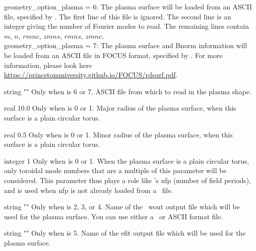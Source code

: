 {{\ttfamily geometry\_option\_plasma} = 6: The plasma surface will be loaded from an ASCII file, specified by . The first line of this file is ignored. The second line is an integer giving the number of Fourier modes
to read. The remaining lines contain $m$, $n$, $rmnc$, $zmns$, $rmns$, $zmnc$. \\

{\ttfamily geometry\_option\_plasma} = 7: The plasma surface and Bnorm information will be loaded from an ASCII file in FOCUS format, specified by . For more information, please look here \url{https://princetonuniversity.github.io/FOCUS/rdsurf.pdf}.

}

\myhrule

{string}
{{\ttfamily ""}}
{Only when  is 6 or 7.}
{ASCII file from which to read in the plasma shape.}

\myhrule

{real}
{10.0}
{Only when  is 0 or 1.}
{Major radius of the plasma surface, when this surface is a plain circular torus.}

\myhrule

{real}
{0.5}
{Only when  is 0 or 1.}
{Minor radius of the plasma surface, when this surface is a plain circular torus.}

\myhrule

{integer}
{1}
{Only when  is 0 or 1.}
{When the plasma surface is a plain circular torus, only toroidal mode numbers that are a multiple of this parameter will be considered.
This parameter thus plays a role like \vmec's {\ttfamily nfp} (number of field periods),
and is used when {\ttfamily nfp} is not already loaded from a \vmec~file.}

\myhrule

{string}
{{\ttfamily ""}}
{Only when  is 2, 3, or 4.}
{Name of the \vmec~{\ttfamily wout} output file which will be used for the plasma surface.
You can use either a \netCDF~or {\ttfamily ASCII} format file.}

\myhrule

{string}
{{\ttfamily ""}}
{Only when  is 5.}
{Name of the {\ttfamily efit} output file which will be used for the plasma surface.}

